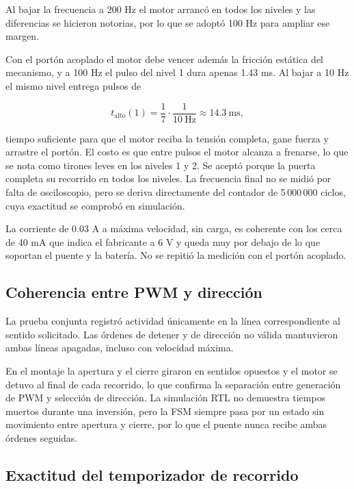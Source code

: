 \documentclass[12pt,letterpaper]{article}
\begin{document}
Al bajar la frecuencia a 200 Hz el motor arrancó en todos
los niveles y las diferencias se hicieron notorias, por lo
que se adoptó 100 Hz para ampliar ese margen.

Con el portón acoplado el motor debe vencer además la
fricción estática del mecanismo, y a 100 Hz el pulso del
nivel 1 dura apenas 1.43 ms. Al bajar a 10 Hz el mismo
nivel entrega pulsos de

\begin{equation}
t_{\mathrm{alto}}(1)=\frac{1}{7}\cdot\frac{1}{10\ \mathrm{Hz}}
\approx 14.3\ \mathrm{ms},
\end{equation}

tiempo suficiente para que el motor reciba la tensión
completa, gane fuerza y arrastre el portón. El costo es
que entre pulsos el motor alcanza a frenarse, lo que se
nota como tirones leves en los niveles 1 y 2. Se aceptó
porque la puerta completa su recorrido en todos los
niveles. La frecuencia final no se midió por falta de
osciloscopio, pero se deriva directamente del contador
de 5\,000\,000 ciclos, cuya exactitud se comprobó en
simulación.

La corriente de 0.03 A a máxima velocidad, sin carga, es
coherente con los cerca de 40 mA que indica el fabricante
a 6 V y queda muy por debajo de lo que soportan el puente
y la batería. No se repitió la medición con el portón
acoplado.

\subsection{Coherencia entre PWM y dirección}

La prueba conjunta registró actividad únicamente en
la línea correspondiente al sentido solicitado.
Las órdenes de detener y de dirección no válida
mantuvieron ambas líneas apagadas, incluso con
velocidad máxima.

En el montaje la apertura y el cierre giraron en sentidos
opuestos y el motor se detuvo al final de cada recorrido,
lo que confirma la separación entre generación de PWM y
selección de dirección. La simulación RTL no demuestra
tiempos muertos durante una inversión, pero la FSM
siempre pasa por un estado sin movimiento entre apertura
y cierre, por lo que el puente nunca recibe ambas órdenes
seguidas.

\subsection{Exactitud del temporizador de recorrido}
\end{document}
